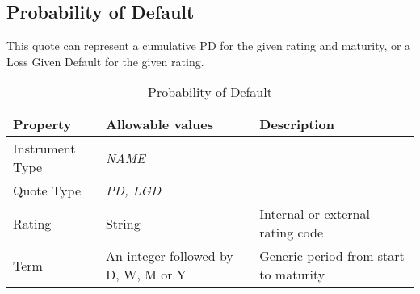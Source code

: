 %
%
%

\subsection{Probability of Default}\label{ss:prob_default_quote}

This quote can represent a cumulative PD for the given rating and maturity, or a Loss Given Default for the given
rating.

\begin{table}[H]
\centering
\begin{tabular}{|p{3cm}|p{3.5cm}|p{7cm}|}
  \hline
  {\bf Property} & {\bf Allowable values} & {\bf Description} \\
  \hline
  Instrument Type & \emph{NAME} & \\ \hline
  Quote Type & \emph{PD, LGD} & \\ \hline
  Rating & String & Internal or external rating code \\ \hline
  Term & An integer followed by D, W, M or Y & Generic period from start to maturity\\ \hline
\end{tabular}
  \caption{Probability of Default}
  \label{tab:pd_quote}
\end{table}

